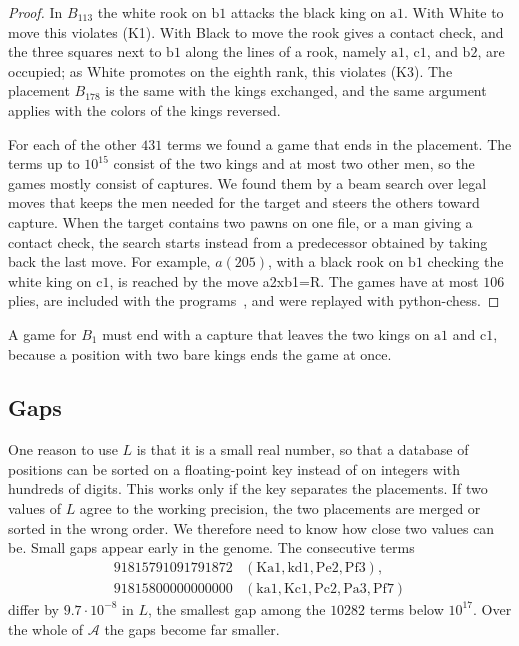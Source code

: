 \documentclass[12pt,reqno]{article}
\newcommand{\adm}{\mathcal{A}}
\newcommand{\sq}[1]{\mathrm{#1}}
\begin{document}
\begin{proof}
In $B_{113}$ the white rook on $\sq{b1}$ attacks the black king on $\sq{a1}$. With White to move
this violates (K1). With Black to move the rook gives a contact check, and the three squares
next to $\sq{b1}$ along the lines of a rook, namely $\sq{a1}$, $\sq{c1}$, and $\sq{b2}$, are occupied;
as White promotes on the eighth rank, this violates (K3). The placement $B_{178}$ is the same
with the kings exchanged, and the same argument applies with the colors of the kings reversed.

For each of the other $431$ terms we found a game that ends in the placement. The terms up to
$10^{15}$ consist of the two kings and at most two other men, so the games mostly consist of
captures. We found them by a beam search over legal moves that keeps the men needed for the
target and steers the others toward capture. When the target contains two pawns on one file, or
a man giving a contact check, the search starts instead from a predecessor obtained by taking
back the last move. For example, $a(205)$, with a black rook on $\sq{b1}$ checking the white king
on $\sq{c1}$, is reached by the move a2xb1=R. The games have at most $106$ plies, are included
with the programs~\cite{software}, and were replayed with python-chess.
\end{proof}

A game for $B_1$ must end with a capture that leaves the two kings on $\sq{a1}$ and $\sq{c1}$,
because a position with two bare kings ends the game at once.

\subsection{Gaps}

One reason to use $L$ is that it is a small real number, so that a database of positions can be
sorted on a floating-point key instead of on integers with hundreds of digits. This works only
if the key separates the placements. If two values of $L$ agree to the working precision, the
two placements are merged or sorted in the wrong order. We therefore need to know how close two
values can be. Small gaps appear early in the genome. The consecutive terms
\begin{displaymath}
\begin{array}{ll}
91815791091791872 & (\sq{Ka1},\sq{kd1},\sq{Pe2},\sq{Pf3}),\\
91815800000000000 & (\sq{ka1},\sq{Kc1},\sq{Pc2},\sq{Pa3},\sq{Pf7})
\end{array}
\end{displaymath}
differ by $9.7\cdot 10^{-8}$ in $L$, the smallest gap among the $10282$ terms below $10^{17}$.
Over the whole of $\adm$ the gaps become far smaller.
\end{document}
